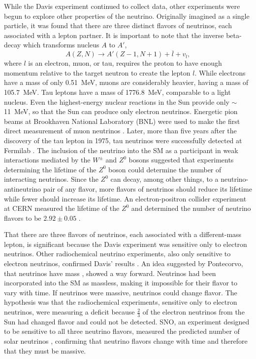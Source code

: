 While the Davis experiment continued to collect data, other experiments were begun to explore other properties of the neutrino.  Originally imagined as a single particle, it was found that there are three distinct flavors of neutrinos, each associated with a lepton partner.  It is important to note that the inverse beta-decay which transforms nucleus $A$ to $A'$,
\begin{equation}
A(Z,N) \rightarrow A'(Z-1,N+1) + \overline{l} + v_l,
\end{equation}
where $l$ is an electron, muon, or tau, requires the proton to have enough momentum relative to the target neutron to create the lepton $l$.  While electrons have a mass of only 0.51~MeV, muons are considerably heavier, having a mass of 105.7~MeV.  Tau leptons have a mass of 1776.8~MeV, comparable to a light nucleus. Even the highest-energy nuclear reactions in the Sun provide only $\sim$11~MeV, so that the Sun can produce only electron neutrinos.  Energetic pion beams at Brookhaven National Laboratory (BNL) were used to make the first direct measurement of muon neutrinos \citep{muonNeutrino}.  Later, more than five years after the discovery of the tau lepton \citep{tauDiscovery} in 1975, tau neutrinos were successfully detected at Fermilab \citep{tauNeutrino}.  The inclusion of the neutrino into the SM as a participant in weak interactions mediated by the $W^{\pm}$ and $Z^0$ bosons suggested that experiments determining the lifetime of the $Z^0$ boson could determine the number of interacting neutrinos.  Since the $Z^0$ can decay, among other things, to a neutrino-antineutrino pair of any flavor, more flavors of neutrinos should reduce its lifetime while fewer should increase its lifetime.   An electron-positron collider experiment at CERN measured the lifetime of the $Z^0$ and determined the number of neutrino flavors to be $2.92\pm0.05$ \citep{PDG}.

That there are three flavors of neutrinos, each associated with a different-mass lepton, is significant because the Davis experiment was sensitive only to electron neutrinos.  Other radiochemical neutrino experiments, also only sensitive to electron neutrinos, confirmed Davis' results \citep{SNO_Sun,SuperK_Sun,PDG}.  An idea suggested by Pontecorvo, that neutrinos have mass \citep{Pontecorvo}, showed a way forward.  Neutrinos had been incorporated into the SM as massless, making it impossible for their flavor to vary with time.  If neutrinos were massive, neutrinos could change flavor.  The hypothesis was that the radiochemical experiments, sensitive only to electron neutrinos, were measuring a deficit because $\frac{2}{3}$ of the electron neutrinos from the Sun had changed flavor and could not be detected.  SNO, an experiment designed to be sensitive to all three neutrino flavors, measured the predicted number of solar neutrinos \citep{SNO_Sun}, confirming that neutrino flavors change with time and therefore that they must be massive.

